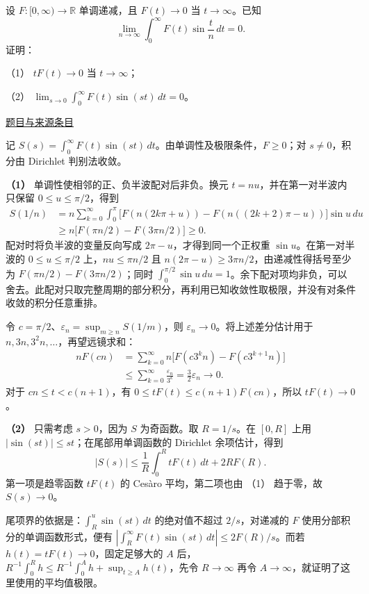\documentclass[12pt,fontset=fandol]{ctexart}
\begin{document}
\begin{example}[来源序号7]\label{ex:pre03-math:7}\label{pr:pre03-math:7}

设 $F:[0,\infty)\to\mathbb R$ 单调递减，且 $F(t)\to0$ 当 $t\to\infty$。已知
\[
\lim_{n\to\infty}\int_0^\infty F(t)\sin\frac tn\,dt=0.
\]
证明：

（1） $tF(t)\to0$ 当 $t\to\infty$；

（2） $\displaystyle\lim_{s\to0}\int_0^\infty F(t)\sin(st)\,dt=0$。

\par\href{https://github.com/lzxcr/cmc-mathematics/blob/64916fa1fdbc3e444a652eca204d5669058ee321/src/problems/preliminary/03/07.md}{题目与来源条目}

\end{example}

\begin{solve}\label{ans:pre03-math:7}

记 $S(s)=\int_0^\infty F(t)\sin(st)\,dt$。由单调性及极限条件，$F\ge0$；对 $s\ne0$，积分由 Dirichlet 判别法收敛。

\textbf{（1）} 单调性使相邻的正、负半波配对后非负。换元 $t=nu$，并在第一对半波内只保留 $0\le u\le\pi/2$，得到
\[
\begin{aligned}
S(1/n)
&=n\sum_{k=0}^\infty\int_0^\pi
\bigl[F(n(2k\pi+u))-F(n((2k+2)\pi-u))\bigr]\sin u\,du\\
&\ge n\bigl[F(\pi n/2)-F(3\pi n/2)\bigr]\ge0.
\end{aligned}
\]
配对时将负半波的变量反向写成 $2\pi-u$，才得到同一个正权重 $\sin u$。在第一对半波的 $0\le u\le\pi/2$ 上，$nu\le\pi n/2$ 且 $n(2\pi-u)\ge3\pi n/2$，由递减性得括号至少为 $F(\pi n/2)-F(3\pi n/2)$；同时 $\int_0^{\pi/2}\sin u\,du=1$。余下配对项均非负，可以舍去。此配对只取完整周期的部分积分，再利用已知收敛性取极限，并没有对条件收敛的积分任意重排。

令 $c=\pi/2$、$\varepsilon_n=\sup_{m\ge n}S(1/m)$，则 $\varepsilon_n\to0$。将上述差分估计用于 $n,3n,3^2n,\ldots$，再望远镜求和：
\[
\begin{aligned}
nF(cn)
&=\sum_{k=0}^\infty n\bigl[F(c3^kn)-F(c3^{k+1}n)\bigr]\\
&\le\sum_{k=0}^\infty\frac{\varepsilon_n}{3^k}
=\frac32\varepsilon_n\longrightarrow0.
\end{aligned}
\]
对于 $cn\le t<c(n+1)$，有 $0\le tF(t)\le c(n+1)F(cn)$，所以 $tF(t)\to0$。

\textbf{（2）} 只需考虑 $s>0$，因为 $S$ 为奇函数。取 $R=1/s$。在 $[0,R]$ 上用 $|\sin(st)|\le st$；在尾部用单调函数的 Dirichlet 余项估计，得到
\[
|S(s)|\le\frac1R\int_0^R tF(t)\,dt+2RF(R).
\]
第一项是趋零函数 $tF(t)$ 的 Cesàro 平均，第二项也由 （1） 趋于零，故 $S(s)\to0$。

尾项界的依据是：$\int_R^u\sin(st)\,dt$ 的绝对值不超过 $2/s$，对递减的 $F$ 使用分部积分的单调函数形式，便有 $|\int_R^\infty F(t)\sin(st)\,dt|\le2F(R)/s$。而若 $h(t)=tF(t)\to0$，固定足够大的 $A$ 后，$R^{-1}\int_0^Rh\le R^{-1}\int_0^A h+\sup_{t\ge A}h(t)$，先令 $R\to\infty$ 再令 $A\to\infty$，就证明了这里使用的平均值极限。

\end{solve}
\end{document}

